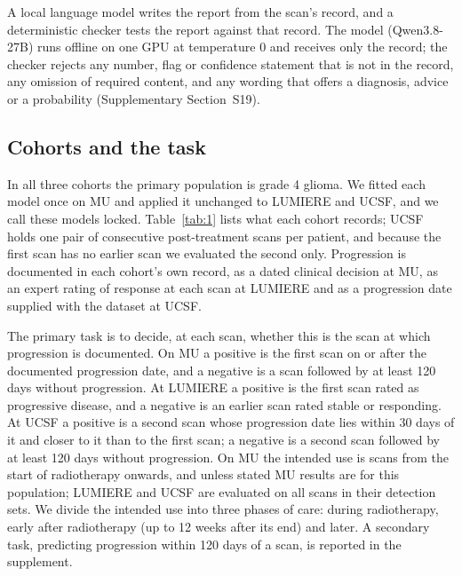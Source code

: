 \documentclass[largeformat]{interact} %
\begin{document}
A local language model writes the report from the scan's record, and a deterministic checker tests the report
against that record. The model (Qwen3.8-27B) runs offline on one GPU at temperature 0 and receives only the record; the checker
rejects any number, flag or confidence statement that is not in the record, any omission of required content, and any
wording that offers a diagnosis, advice or a probability (Supplementary Section~S19).

\subsection{Cohorts and the task}\label{sec:2.2}

In all three cohorts the primary population is grade 4 glioma. We fitted each model once on MU and applied it
unchanged to LUMIERE and UCSF, and we call these models locked. Table~\ref{tab:1} lists what each cohort
records; UCSF holds one pair of consecutive post-treatment scans per patient, and because the first scan has no earlier
scan we evaluated the second only. Progression is documented in each cohort's own record, as a dated clinical decision
at MU, as an expert rating of response at each scan at LUMIERE and as a progression date supplied with the dataset at
UCSF.

The primary task is to decide, at each scan, whether this is the scan at which progression is documented. On MU a positive is the first
scan on or after the documented progression date, and a negative is a scan followed by at least 120 days without
progression. At LUMIERE a positive is the first scan rated as progressive disease, and a negative is an earlier scan
rated stable or responding. At UCSF a positive is a second scan whose progression date lies within 30 days of it and closer to it than to the
first scan; a negative is a second scan followed by at least 120 days without progression. On MU the intended use is scans from the start of radiotherapy
onwards, and unless stated MU results are for this population; LUMIERE and UCSF are evaluated on all scans in their
detection sets. We divide the intended use into three phases of care: during radiotherapy, early after radiotherapy (up to 12
weeks after its end) and later. A secondary task, predicting progression within 120 days of a scan, is reported in
the supplement.
\end{document}
